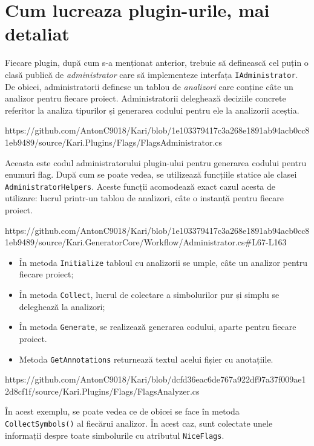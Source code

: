 \documentclass[a4paper,12pt]{report}
\begin{document}
\section{Cum lucreaza plugin-urile, mai detaliat}

Fiecare plugin, după cum s-a menționat anterior, trebuie să definească cel puțin o clasă publică de \emph{administrator} care să implementeze interfața \texttt{IAdministrator}.
De obicei, administratorii definesc un tablou de \emph{analizori} care conține câte un analizor pentru fiecare proiect.
Administratorii deleghează deciziile concrete referitor la analiza tipurilor și generarea codului pentru ele la analizorii aceștia.

https://github.com/AntonC9018/Kari/blob/1e103379417c3a268e1891ab94acb0cc81eb9489/source/Kari.Plugins/Flags/FlagsAdministrator.cs

Aceasta este codul administratorului plugin-ului pentru generarea codului pentru enumuri flag.
După cum se poate vedea, se utilizează funcțiile statice ale clasei \texttt{AdministratorHelpers}.
Aceste funcții acomodează exact cazul acesta de utilizare: lucrul printr-un tablou de analizori, câte o instanță pentru fiecare proiect.

https://github.com/AntonC9018/Kari/blob/1e103379417c3a268e1891ab94acb0cc81eb9489/source/Kari.GeneratorCore/Workflow/Administrator.cs#L67-L163 

\begin{itemize}
  \item În metoda \texttt{Initialize\(\)} tabloul cu analizorii se umple, câte un analizor pentru fiecare proiect;
  \item În metoda \texttt{Collect\(\)}, lucrul de colectare a simbolurilor pur și simplu se deleghează la analizori;
  \item În metoda \texttt{Generate\(\)}, se realizează generarea codului, aparte pentru fiecare proiect.
  \item Metoda \texttt{GetAnnotations\(\)} returnează textul acelui fișier cu anotațiile.
\end{itemize}

https://github.com/AntonC9018/Kari/blob/dcfd36eac6de767a922df97a37f009ae12d8cf1f/source/Kari.Plugins/Flags/FlagsAnalyzer.cs

În acest exemplu, se poate vedea ce de obicei se face în metoda \texttt{CollectSymbols()} al fiecărui analizor.
În acest caz, sunt colectate unele informații despre toate simbolurile cu atributul \texttt{NiceFlags}.
\end{document}
